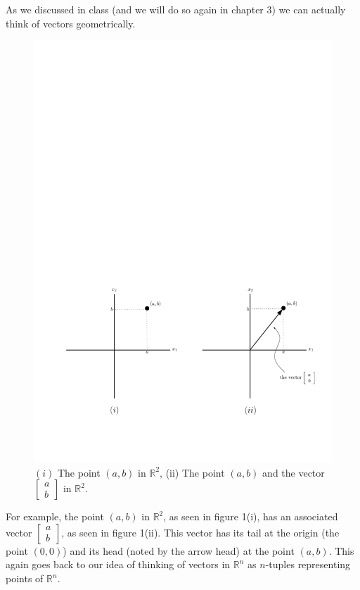 \documentclass[12pt]{article}
\begin{document}
As we discussed in class (and we will do so again in chapter 3) we can actually think of vectors geometrically.

\begin{figure}[h!]
\begin{center} 
\includegraphics[width = 1 \textwidth]{l12comim1}
\caption{$(i)$ The point $(a,b)$ in $\mathbb{R}^2$, (ii) The point $(a,b)$ and the vector $\left[ \begin{array}{c} a \\ b  \end{array} \right]$ in $\mathbb{R}^2$.}
\end{center}
\end{figure} 

For example, the point $(a,b)$ in $\mathbb{R}^2$, as seen in figure 1(i), has an associated vector $\left[ \begin{array}{c} a \\ b  \end{array} \right]$, as seen in figure 1(ii).  This vector has its tail at the origin (the point $(0,0)$) and its head (noted by the arrow head) at the point $(a,b)$.  This again goes back to our idea of thinking of vectors in $\mathbb{R}^n$ as $n$-tuples representing points of $\mathbb{R}^n$.
\end{document}
